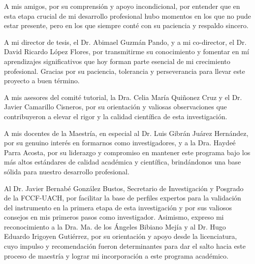 \documentclass[12pt,letterpaper,oneside]{report}
\begin{document}
\begin{flushleft}
\singlespacing
\justifying
{\itshape\fontsize{12}{14}\selectfont 

A mis amigos, por su comprensión y apoyo incondicional, por entender que en esta etapa crucial de mi desarrollo profesional hubo momentos en los que no pude estar presente, pero en los que siempre conté con su paciencia y respaldo sincero.

A mi director de tesis, el Dr. Abimael Guzmán Pando, y a mi co-director, el Dr. David Ricardo López Flores, por transmitirme su conocimiento y fomentar en mí aprendizajes significativos que hoy forman parte esencial de mi crecimiento profesional. Gracias por su paciencia, tolerancia y perseverancia para llevar este proyecto a buen término.

A mis asesores del comité tutorial, la Dra. Celia María Quiñonez Cruz y el Dr. Javier Camarillo Cisneros, por su orientación y valiosas observaciones que contribuyeron a elevar el rigor y la calidad científica de esta investigación.

A mis docentes de la Maestría, en especial al Dr. Luis Gibrán Juárez Hernández, por su genuino interés en formarnos como investigadores, y a la Dra. Haydeé Parra Acosta, por su liderazgo y compromiso en mantener este programa bajo los más altos estándares de calidad académica y científica, brindándonos una base sólida para nuestro desarrollo profesional.

Al Dr. Javier Bernabé González Bustos, Secretario de Investigación y Posgrado de la FCCF-UACH, por facilitar la base de perfiles expertos para la validación del instrumento en la primera etapa de esta investigación y por sus valiosos consejos en mis primeros pasos como investigador. Asimismo, expreso mi reconocimiento a la Dra. Ma. de los Ángeles Bibiano Mejía y al Dr. Hugo Eduardo Irigoyen Gutiérrez, por su orientación y apoyo desde la licenciatura, cuyo impulso y recomendación fueron determinantes para dar el salto hacia este proceso de maestría y lograr mi incorporación a este programa académico.

}
\end{flushleft}

\clearpage  %

\setcounter{page}{7}  %
\end{document}
